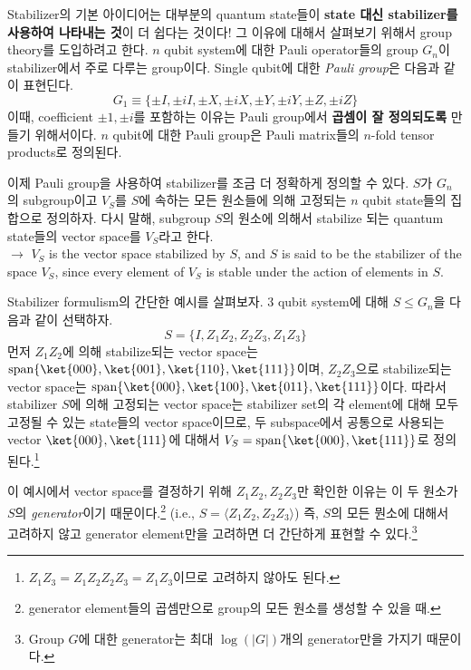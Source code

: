 \vspace{1em}
Stabilizer의 기본 아이디어는 대부분의 quantum state들이 \textbf{state 대신 stabilizer를 사용하여 나타내는 것}이 더 쉽다는 것이다! 그 이유에 대해서 살펴보기 위해서 group theory를 도입하려고 한다. 
$n$ qubit system에 대한 Pauli operator들의 group $G_n$이 stabilizer에서 주로 다루는 group이다. Single qubit에 대한 \textit{Pauli group}은 다음과 같이 표현딘다. 
\begin{equation*}
    G_1 \equiv\{ \pm I, \pm i I, \pm X, \pm i X, \pm Y, \pm i Y, \pm Z, \pm i Z\}
\end{equation*}
이때, coefficient $\pm 1, \pm i$를 포함하는 이유는 Pauli group에서 \textbf{곱셈이 잘 정의되도록} 만들기 위해서이다. $n$ qubit에 대한 Pauli group은 Pauli matrix들의 $n$-fold tensor products로 정의된다. 

이제 Pauli group을 사용하여 stabilizer를 조금 더 정확하게 정의할 수 있다. $S$가 $G_n$의 subgroup이고 $V_S$를 $S$에 속하는 모든 원소들에 의해 고정되는 $n$ qubit state들의 집합으로 정의하자. 다시 말해, subgroup $S$의 원소에 의해서 stabilize 되는 quantum state들의 vector space를 $V_S$라고 한다. \\
$\rightarrow$ $V_S$ is the vector space stabilized by $S$, and $S$ is said to be the stabilizer of the space $V_S$, since every element of $V_S$ is stable under the action of elements in $S$.

\vspace{1em}
Stabilizer formulism의 간단한 예시를 살펴보자. $3$ qubit system에 대해 $S \le G_n$을 다음과 같이 선택하자.
\begin{equation*}
    S = \{I, Z_1Z_2, Z_2Z_3, Z_1Z_3\}
\end{equation*}
먼저 $Z_1Z_2$에 의해 stabilize되는 vector space는 $\text{span}\{\ket{000}, \ket{001}, \ket{110}, \ket{111}\}$이며, $Z_2Z_3$으로 stabilize되는 vector space는 $\text{span}\{\ket{000}, \ket{100}, \ket{011}, \ket{111}\}$이다. 
따라서 stabilizer $S$에 의해 고정되는 vector space는 stabilizer set의 각 element에 대해 모두 고정될 수 있는 state들의 vector space이므로, 두 subspace에서 공통으로 사용되는 vector $\ket{000}, \ket{111}$에 대해서 $V_S = \text{span} \{\ket{000}, \ket{111}\}$로 정의된다.\footnote{$Z_1Z_3 = Z_1Z_2Z_2Z_3 = Z_1Z_3$이므로 고려하지 않아도 된다.}

이 예시에서 vector space를 결정하기 위해 $Z_1Z_2, Z_2Z_3$만 확인한 이유는 이 두 원소가 $S$의 \textit{generator}이기 때문이다.\footnote{generator element들의 곱셈만으로 group의 모든 원소를 생성할 수 있을 때.} (i.e., $S = \langle Z_1Z_2, Z_2Z_3\rangle$)
즉, $S$의 모든 뭔소에 대해서 고려하지 않고 generator element만을 고려하면 더 간단하게 표현할 수 있다.\footnote{Group $G$에 대한 generator는 최대 $\log(|G|)$개의 generator만을 가지기 때문이다.}

